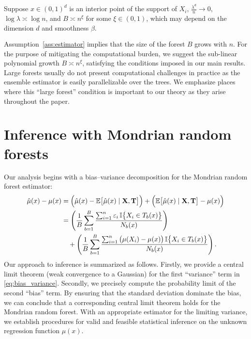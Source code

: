 \begin{assumption}%
  \label{ass:estimator}
  Suppose $x \in (0,1)^d$ is an interior point of the support of $X_i$,
  $\frac{\lambda^d}{n} \to 0$,
  $\log \lambda \asymp \log n$,
  and $B \asymp n^{\xi}$ for some $\xi \in (0, 1)$,
  which may depend on the dimension $d$ and smoothness $\beta$.
\end{assumption}

Assumption~\ref{ass:estimator} implies that the size of the forest $B$ grows
with $n$. For the purpose of mitigating the computational burden, we suggest
the sub-linear polynomial growth $B \asymp n^{\xi}$, satisfying the conditions
imposed in our main results. Large forests usually do not present computational
challenges in practice as the ensemble estimator is easily parallelizable over
the trees. We emphasize places where this ``large forest'' condition is
important to our theory as they arise throughout the paper.

\section{Inference with Mondrian random forests}%
\label{sec:mondrian_inference}

Our analysis begins with a bias--variance decomposition for the Mondrian random
forest estimator:
%
\begin{align}
  \nonumber
  \hat\mu(x) - \mu(x)
  &=
  \Big( \hat\mu(x) - \mathbb{E} \big[ \hat \mu(x) \mid \mathbf{X}, \mathbf{T} \big]\Big)
  + \Big( \mathbb{E} \big[ \hat \mu(x) \mid \mathbf{X}, \mathbf{T} \big] - \mu(x)\Big) \\
  &=
  \nonumber
  \left(
    \frac{1}{B}
    \sum_{b=1}^B
    \frac{\sum_{i=1}^n \varepsilon_i \, \mathbb{I}\big\{ X_i \in T_b(x) \big\}}
    {N_b(x)}
  \right) \\
  \label{eq:bias_variance}
  &\quad+
  \left(
    \frac{1}{B}
    \sum_{b=1}^B
    \frac{\sum_{i=1}^n \big(\mu(X_i) - \mu(x)\big) \,
    \mathbb{I}\big\{ X_i \in T_b(x) \big\}}
    {N_b(x)}
  \right).
\end{align}
%
Our approach to inference is summarized as follows.
Firstly, we provide a central limit theorem
(weak convergence to a Gaussian)
for the first ``variance'' term in \eqref{eq:bias_variance}.
Secondly, we precisely compute the probability limit of the second
``bias'' term.
By ensuring that the standard deviation dominate the bias,
we can conclude that a corresponding central limit theorem
holds for the Mondrian random forest.
With an appropriate estimator for the limiting variance,
we establish procedures for valid and feasible statistical inference
on the unknown regression function $\mu(x)$.

